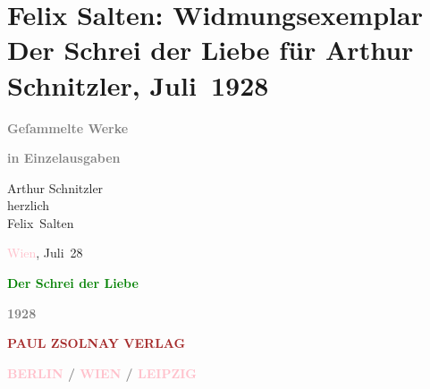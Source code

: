 

\renewcommand{\erwaehntePersonen}{Personen: Felix Salten}
\renewcommand{\erwaehnteInstitutionen}{Institutionen: Paul Zsolnay Verlag}
\renewcommand{\erwaehnteOrte}{Orte: Berlin, Leipzig, Wien}
\renewcommand{\erwaehnteWerke}{Werke: Der Schrei der Liebe. Novellen}
\section[Felix Salten: Widmungsexemplar Der Schrei der Liebe für Arthur Schnitzler, Juli 1928]{Felix Salten: Widmungsexemplar Der Schrei der Liebe für Arthur
               Schnitzler, Juli 1928}
\nopagebreak{}
\rehead{ }\normalsize\beginnumbering{}
\toendnotes[C]{\smallbreak\pagebreak[2]}
\pstart
           \noindent{}\centering{}{\pb}\textcolor{gray}{\textbf{\textsc{}}}\pend
           
\pstart
           \noindent{}\centering{}\textcolor{gray}{\textbf{Geſammelte Werke}}\pend
           
\pstart
           \noindent{}\centering{}\textcolor{gray}{\textbf{in Einzelausgaben}}\pend
           
\pstart
           \noindent{}Arthur Schnitzler {\\}herzlich {\\}\spacefill\mbox{Felix Salten}\pend
           
\pstart
           \textcolor{pink}{Wien}{}\ledrightnote{\textcolor{pink}{Wien}}, Juli 28\pend
           {\bigskip}
\pstart
           \noindent{}\centering{}{\pb}\textcolor{gray}{\textbf{\textsc{}}}\pend
           
\pstart
           \noindent{}\centering{}\textcolor{gray}{\textbf{\textcolor{green}{Der Schrei der Liebe}{}\ledrightnote{\textcolor{green}{Der Schrei der Liebe. Novellen}}}}\pend
           
\pstart
           \noindent{}\centering{}\textcolor{gray}{\textbf{\textsc{}}}\pend
           {\bigskip}
\pstart
           \noindent{}\centering{}\textcolor{gray}{\textbf{\textsc{1928}}}\pend
           
\pstart
           \noindent{}\centering{}\textcolor{gray}{\textbf{\textsc{\textcolor{brown}{PAUL ZSOLNAY VERLAG}{}\ledrightnote{\textcolor{brown}{Paul Zsolnay Verlag}}}}}\pend
           
\pstart
           \noindent{}\centering{}\textcolor{gray}{\textbf{\textsc{\textcolor{pink}{BERLIN}{}\ledrightnote{\textcolor{pink}{Berlin}} / \textcolor{pink}{WIEN}{}\ledrightnote{\textcolor{pink}{Wien}} / \textcolor{pink}{LEIPZIG}{}\ledrightnote{\textcolor{pink}{Leipzig}}}}}\pend
           \endnumbering{}  
      